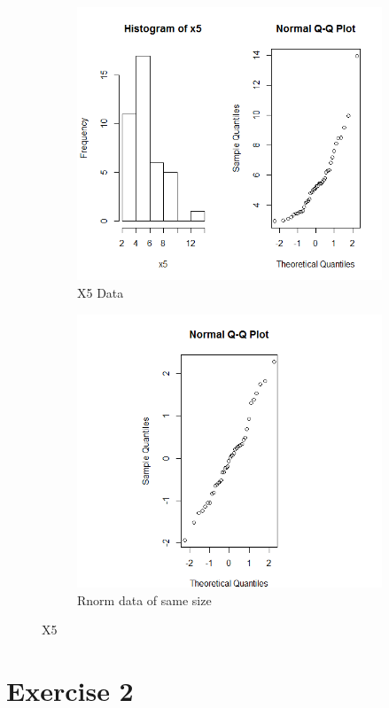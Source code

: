 \documentclass{article}
\begin{document}
    \begin{figure}
    \begin{subfigure}{.5\textwidth}
      \centering
      \includegraphics[width=.8\linewidth]{results/X5}
      \caption{X5 Data}
    \end{subfigure}
    \begin{subfigure}{.5\textwidth}
      \centering
      \includegraphics[width=.8\linewidth]{results/X5_2}
      \caption{Rnorm data of same size}
    \end{subfigure}
    \caption{X5}
    \label{fig:X5}
    \end{figure}

  \section{Exercise 2}
\end{document}
